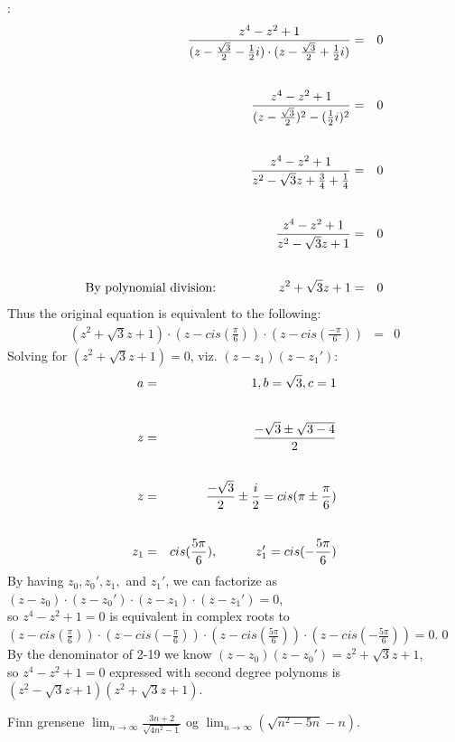 \documentclass{myassignment}
\begin{document}
\begin{answer}
		:
		\begin{eqnarray}
			\frac{z^4 - z^2 + 1}{(z - \frac{\sqrt{3}}{2} - \frac {1}{2}i)\cdot(z - \frac{\sqrt{3}}{2} + \frac {1}{2}i)} &=& 0 \\[2em]
			\frac{z^4 - z^2 + 1}{(z - \frac{\sqrt{3}}{2})^2 - (\frac {1}{2}i)^2} &=& 0 \\[2em]
			\frac{z^4 - z^2 + 1}{z^2 - \sqrt{3}z + \frac{3}{4} + \frac {1}{4}} &=& 0 \\[2em]
			\frac{z^4 - z^2 + 1}{z^2 - \sqrt{3}z + 1} &=& 0\\[2em]
		\text{By polynomial division:}\hspace*{5em} 
		z^2+\sqrt{3}z+1 &=& 0
		\end{eqnarray}
		Thus the original equation is equivalent to the following:
		\begin{eqnarray}
			(z^2+\sqrt{3}z+1)\cdot(z-cis(\frac{\pi}{6}))\cdot(z-cis(\frac{-\pi}{6})) &=&0
		\end{eqnarray}
		Solving for $(z^2+\sqrt{3}z+1)=0$, viz. $(z-z_1)(z-z_1')$:
		\begin{eqnarray}
			a &=& 1, b = \sqrt{3}, c = 1 \\[2em]
			z &=& \frac{-\sqrt{3}\pm\sqrt{3-4}}{2} \\[2em]
			z &=& \frac{-\sqrt{3}}{2}\pm\frac{i}{2} = cis(\pi\pm \frac{\pi}{6}) \\[2em]
			z_1 &=& cis(\frac{5\pi}{6}), \hspace*{3em} z_1' = cis(-\frac{5\pi}{6})
		\end{eqnarray}
		\blackqed
		By having $z_0, z_0', z_1,$ and $z_1'$, we can factorize as $(z-z_0)\cdot(z-z_0')\cdot(z-z_1)\cdot(z-z_1')=0$, \\[1em]
		so $z^4 - z^2 + 1=0$ is equivalent in complex roots to\\[1em]
		$(z-cis(\frac{\pi}{6}))\cdot(z-cis(-\frac{\pi}{6}))\cdot(z-cis(\frac{5\pi}{6}))\cdot(z-cis(-\frac{5\pi}{6}))=0$.\qed \\[1em]
		By the denominator of 2-19 we know $(z-z_0)(z-z_0')=z^2+\sqrt{3}z+1$, \\[1em]
		so $z^4 - z^2 + 1=0$ expressed with second degree polynoms is $(z^2 - \sqrt{3}z + 1)(z^2+\sqrt{3}z+1).$

	\end{answer}


	\pagebreak
	\begin{problem}
		Finn grensene $\lim_{n \rightarrow \infty}\frac{3n + 2}{\sqrt{4n^2 - 1}}$ og $\lim_{n\rightarrow\infty}(\sqrt{n^2 - 5n} - n)$.
	\end{problem}
\end{document}
